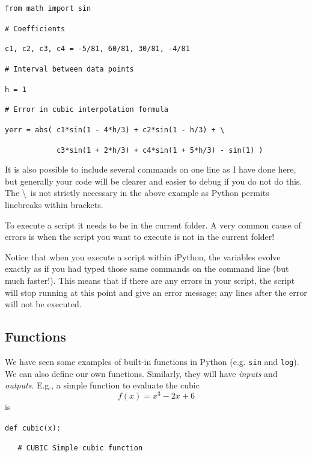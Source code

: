 \noindent
\texttt{from math import sin}

\noindent
\texttt{\# Coefficients}

\noindent
\texttt{c1, c2, c3, c4 = -5/81, 60/81, 30/81, -4/81}

\noindent
\texttt{\# Interval between data points}

\noindent
\texttt{h = 1}

\noindent
\texttt{\# Error in cubic interpolation formula}

\noindent
\texttt{yerr = abs( c1*sin(1 - 4*h/3) + c2*sin(1 - h/3) + \textbackslash }

\noindent
\texttt{\ \ \ \ \ \ \ \ \ \ \ \ c3*sin(1 + 2*h/3) + c4*sin(1 + 5*h/3) - sin(1) )}

\vspace{3mm}

\noindent
It is also possible to include several commands on one line as I have
done here, but generally your code will be clearer and easier to debug
if you do not do this. The \textbackslash ~is not strictly necessary in
the above example as Python permits linebreaks within brackets.

To execute a script it needs to be in the current folder. A very
common cause of errors is when the script you want to execute is not
in the current folder!

Notice that when you execute a script within iPython, the variables
evolve exactly as if you had typed those same commands on the command
line (but much faster!). This means that if there are any errors in
your script, the script will stop running at this point and give an
error message; any lines after the error will not be executed.


\subsection{Functions}

We have seen some examples of built-in functions in Python
(e.g. \texttt{sin} and \texttt{log}). We can also define our own
functions. Similarly, they will have \textit{inputs} and
\textit{outputs}. E.g., a simple function to evaluate the cubic
\begin{displaymath}
f(x) = x^3 -2x + 6
\end{displaymath}
is

\vspace{3mm}

\noindent
\texttt{def cubic(x):}

\noindent
\texttt{\ \ \ \# CUBIC Simple cubic function}

